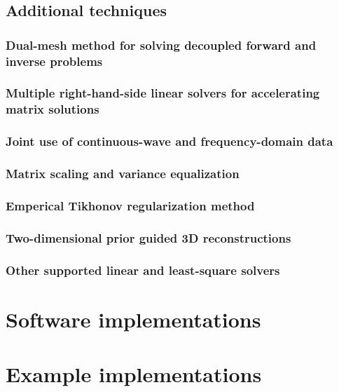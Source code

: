 \documentclass[12pt]{book}               %
\begin{document}
\section{Additional techniques}

\subsection{Dual-mesh method for solving decoupled forward and inverse problems}

\subsection{Multiple right-hand-side linear solvers for accelerating matrix solutions}

\subsection{Joint use of continuous-wave and frequency-domain data}

\subsection{Matrix scaling and variance equalization}

\subsection{Emperical Tikhonov regularization method}

\subsection{Two-dimensional prior guided 3D reconstructions}

\subsection{Other supported linear and least-square solvers}

\chapter{Software implementations}

\chapter{Example implementations}




\end{document}
